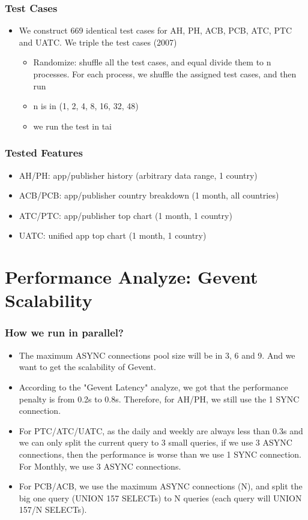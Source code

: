 \documentclass{beamer}
\begin{document}
\begin{frame}
\frametitle{Test Cases}
\begin{itemize}
\item We construct 669 identical test cases for AH, PH, ACB, PCB, ATC, PTC and UATC. We triple the test cases (2007)
	\begin{itemize}
	\item Randomize: shuffle all the test cases, and equal divide them to n processes. For each process, we shuffle the assigned test cases, and then run 
	\item n is in (1, 2, 4, 8, 16, 32, 48)
	\item we run the test in tai
	\end{itemize}	
\end{itemize}
\end{frame}

\begin{frame}
\frametitle{Tested Features}
\begin{itemize}
\item AH/PH: app/publisher history (arbitrary data range, 1 country)
\item ACB/PCB: app/publisher country breakdown (1 month, all countries)
\item ATC/PTC: app/publisher top chart (1 month, 1 country)
\item UATC: unified app top chart	(1 month, 1 country)
\end{itemize}
\end{frame}

\section{Performance Analyze: Gevent Scalability}
\begin{frame}
\frametitle{How we run in parallel?}
\begin{itemize}
\item The maximum ASYNC connections pool size will be in 3, 6 and 9. And we want to get the scalability of Gevent.
\item According to the "Gevent Latency" analyze, we got that the performance penalty is from 0.2s to 0.8s. Therefore, for AH/PH, we still use the 1 SYNC connection.
\item For PTC/ATC/UATC, as the daily and weekly are always less than 0.3s and we can only split the current query to 3 small queries, if we use 3 ASYNC connections, then the performance is worse than we use 1 SYNC connection. For Monthly, we use 3 ASYNC connections.
\item For PCB/ACB, we use the maximum ASYNC connections (N), and split  the big one query (UNION 157 SELECTs) to N queries (each query will UNION 157/N SELECTs). 
\end{itemize}
\end{frame}
\end{document}
